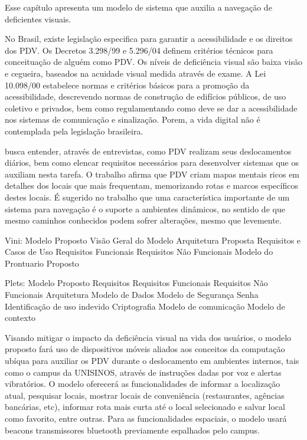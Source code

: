 \documentclass[english,brazilian]{UNISINOSmonografia}
\begin{document}
Esse capítulo apresenta um modelo de sistema que auxilia a navegação de deficientes visuais.




No Brasil, existe legislação especifica para garantir a acessibilidade e os direitos dos PDV. Os Decretos 3.298/99 e 5.296/04 definem critérios técnicos para conceituação de alguém como PDV. Os níveis de deficiência visual são baixa visão e cegueira, baseados na acuidade visual medida através de exame. A Lei 10.098/00 estabelece normas e critérios básicos para a promoção da acessibilidade, descrevendo normas de construção de edifícios públicos, de uso coletivo e privados, bem como regulamentando como deve se dar a acessibilidade nos sistemas de comunicação e sinalização. Porem, a vida digital não é contemplada pela legislação brasileira.


 busca entender, através de entrevistas, como PDV realizam seus deslocamentos diários, bem como elencar requisitos necessários para desenvolver sistemas que os auxiliam nesta tarefa. O trabalho afirma que PDV criam mapas mentais ricos em detalhes dos locais que mais frequentam, memorizando rotas e marcos específicos destes locais. É sugerido no trabalho que uma característica importante de um sistema para navegação é o suporte a ambientes dinâmicos, no sentido de que mesmo caminhos conhecidos podem sofrer alterações, mesmo que levemente.




Vini:
Modelo Proposto
	Visão Geral do Modelo
	Arquitetura Proposta
	Requisitos e Casos de Uso
		Requisitos Funcionais
		Requisitos Não Funcionais
	Modelo do Prontuario Proposto


Plets:
Modelo Proposto
	Requisitos
		Requisitos Funcionais
		Requisitos Não Funcionais
	Arquitetura
	Modelo de Dados
	Modelo de Segurança
		Senha
		Identificação de uso indevido
		Criptografia
	Modelo de comunicação
	Modelo de contexto


Visando mitigar o impacto da deficiência visual na vida dos usuários, o modelo proposto fará uso de dispositivos móveis aliados aos conceitos da computação ubíqua para auxiliar os PDV durante o deslocamento em ambientes internos, tais como o campus da UNISINOS, através de instruções dadas por voz e alertas vibratórios. O modelo oferecerá as funcionalidades de informar a localização atual, pesquisar locais, mostrar locais de conveniência (restaurantes, agências bancárias, etc), informar rota mais curta até o local selecionado e salvar local como favorito, entre outras. Para as funcionalidades espaciais, o modelo usará beacons transmissores bluetooth previamente espalhados pelo campus.
\end{document}
